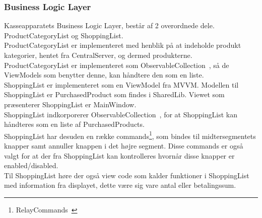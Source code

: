 \subsubsection{Business Logic Layer}
Kasseapparatets Business Logic Layer, består af 2 overordnede dele. ProductCategoryList og ShoppingList. \\

ProductCategoryList er implementeret med henblik på at indeholde produkt kategorier, hentet fra CentralServer, og dermed produkterne. ProductCategoryList er implementeret som ObservableCollection~\cite{ObsCol}, så de ViewModels som benytter denne, kan håndtere den som en liste.\\

ShoppingList er implementeret som en ViewModel fra MVVM. Modellen til ShoppingList er PurchasedProduct som findes i SharedLib. Viewet som præsenterer ShoppingList er MainWindow. \\
ShoppingList indkorporerer ObservableCollection~\cite{ObsCol}, for at ShoppingList kan håndteres som en liste af PurchasedProducts. \\
ShoppingList har desuden en række commands\footnote{RelayCommands~\cite{RelayC}}, som bindes til midtersegmentets knapper samt annuller knappen i det højre segment. Disse commands er også valgt for at der fra ShoppingList kan kontrolleres hvornår disse knapper er enabled/disabled.\\
Til ShoppingList høre der også view code som kalder funktioner i ShoppingList med information fra displayet, dette være sig vare antal eller betalingssum.\\